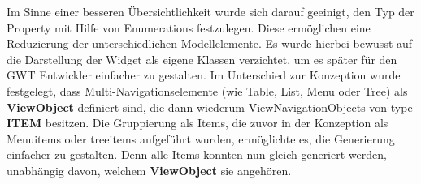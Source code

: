Im Sinne einer besseren Übersichtlichkeit wurde sich darauf geeinigt, den Typ der Property mit Hilfe von Enumerations festzulegen. Diese ermöglichen eine Reduzierung der unterschiedlichen Modellelemente. Es wurde hierbei bewusst auf die Darstellung der Widget als eigene Klassen verzichtet, um es später für den GWT Entwickler einfacher zu gestalten. Im Unterschied zur Konzeption wurde festgelegt, dass Multi-Navigationselemente (wie Table, List, Menu oder Tree) als  \textbf{ViewObject} definiert sind, die dann wiederum ViewNavigationObjects von type  \textbf{ITEM} besitzen. Die Gruppierung als Items, die zuvor in der Konzeption als Menuitems oder treeitems aufgeführt wurden, ermöglichte es, die Generierung einfacher zu gestalten. Denn alle Items konnten nun gleich generiert werden, unabhängig davon, welchem  \textbf{ViewObject} sie angehören.\\

